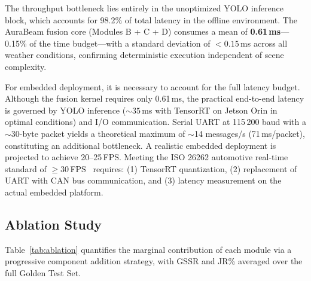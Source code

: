 \documentclass{jstarticle}
\theoremstyle{remark}
\begin{document}
The throughput bottleneck lies entirely in the unoptimized YOLO
inference block, which accounts for 98.2\% of total latency in the
offline environment. The AuraBeam fusion core (Modules B + C + D)
consumes a mean of \textbf{0.61\,ms}---0.15\% of the time
budget---with a standard deviation of $< 0.15$\,ms across all
weather conditions, confirming deterministic execution independent of
scene complexity.

For embedded deployment, it is necessary to account for the full
latency budget. Although the fusion kernel requires only 0.61\,ms, the
practical end-to-end latency is governed by YOLO inference
(${\sim}35$\,ms with TensorRT on Jetson Orin in optimal conditions)
and I/O communication. Serial UART at 115\,200 baud with a
${\sim}$30-byte packet yields a theoretical maximum of ${\sim}$14
messages/s (71\,ms/packet), constituting an additional bottleneck.
A realistic embedded deployment is projected to achieve 20--25\,FPS.
Meeting the ISO 26262 automotive real-time standard of
$\geq$30\,FPS~\cite{ISO26262_2018} requires: (1) TensorRT quantization,
(2) replacement of UART with CAN bus communication, and (3) latency
measurement on the actual embedded platform.

\subsection{Ablation Study}
\label{subsec:ablation}

Table~\ref{tab:ablation} quantifies the marginal contribution of each
module via a progressive component addition strategy, with GSSR and
JR\% averaged over the full Golden Test Set.

\begin{table}[H]
\centering
\caption{Ablation study: marginal contribution of each module
         (mean over the full Golden Test Set)}
\label{tab:ablation}
\end{table}
\end{document}
